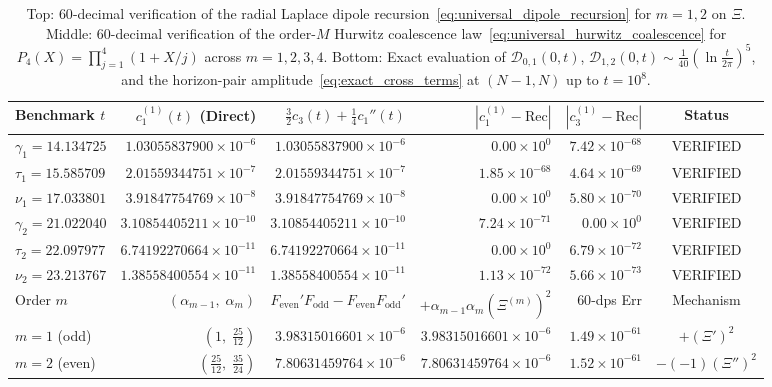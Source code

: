 \documentclass[11pt,reqno]{amsart}
\theoremstyle{definition}
\theoremstyle{remark}
\numberwithin{equation}{section}
\begin{document}
\begin{table}[t]
\centering
\caption{Top: $60$-decimal verification of the radial Laplace dipole recursion~\eqref{eq:universal_dipole_recursion} for $m = 1, 2$ on $\Xi$. Middle: $60$-decimal verification of the order-$M$ Hurwitz coalescence law~\eqref{eq:universal_hurwitz_coalescence} for $P_4(X) = \prod_{j=1}^4 (1 + X/j)$ across $m = 1, 2, 3, 4$. Bottom: Exact evaluation of $\mathcal{D}_{0,1}(0,t)$, $\mathcal{D}_{1,2}(0,t) \sim \frac{1}{40}(\ln\frac{t}{2\pi})^5$, and the horizon-pair amplitude~\eqref{eq:exact_cross_terms} at $(N-1, N)$ up to $t = 10^8$.}\label{tab:laplace_hurwitz_boundary}
\scriptsize
\setlength{\tabcolsep}{3.0pt}
\begin{tabular}{@{}lrrrrc@{}}
\toprule
Benchmark $t$ & $c_1^{(1)}(t)$ (Direct) & $\frac{3}{2}c_3(t) + \frac{1}{4}c_1''(t)$ & $|c_1^{(1)} - \text{Rec}|$ & $|c_3^{(1)} - \text{Rec}|$ & Status \\
\midrule
$\gamma_1 = 14.134725$ & $1.03055837900\times 10^{-6}$  & $1.03055837900\times 10^{-6}$  & $0.00\times 10^{0}$   & $7.42\times 10^{-68}$ & VERIFIED \\
$\tau_1 = 15.585709$   & $2.01559344751\times 10^{-7}$  & $2.01559344751\times 10^{-7}$  & $1.85\times 10^{-68}$ & $4.64\times 10^{-69}$ & VERIFIED \\
$\nu_1 = 17.033801$    & $3.91847754769\times 10^{-8}$  & $3.91847754769\times 10^{-8}$  & $0.00\times 10^{0}$   & $5.80\times 10^{-70}$ & VERIFIED \\
$\gamma_2 = 21.022040$ & $3.10854405211\times 10^{-10}$ & $3.10854405211\times 10^{-10}$ & $7.24\times 10^{-71}$ & $0.00\times 10^{0}$   & VERIFIED \\
$\tau_2 = 22.097977$   & $6.74192270664\times 10^{-11}$ & $6.74192270664\times 10^{-11}$ & $0.00\times 10^{0}$   & $6.79\times 10^{-72}$ & VERIFIED \\
$\nu_2 = 23.213767$    & $1.38558400554\times 10^{-11}$ & $1.38558400554\times 10^{-11}$ & $1.13\times 10^{-72}$ & $5.66\times 10^{-73}$ & VERIFIED \\
\midrule
Order $m$ & $(\alpha_{m-1},\; \alpha_m)$ & $F_{\mathrm{even}}'F_{\mathrm{odd}} - F_{\mathrm{even}}F_{\mathrm{odd}}'$ & $+\alpha_{m-1}\alpha_m(\Xi^{(m)})^2$ & $60$-dps Err & Mechanism \\
\midrule
$m = 1$ (odd)  & $(1,\; \tfrac{25}{12})$       & $3.98315016601\times 10^{-6}$ & $3.98315016601\times 10^{-6}$ & $1.49\times 10^{-61}$ & $+(\Xi')^2$ \\
$m = 2$ (even) & $(\tfrac{25}{12},\; \tfrac{35}{24})$ & $7.80631459764\times 10^{-6}$ & $7.80631459764\times 10^{-6}$ & $1.52\times 10^{-61}$ & $-(-1)(\Xi'')^2$ \\

\end{tabular}
\end{table}
\end{document}
